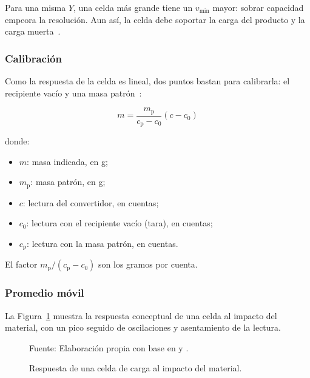 Para una misma $Y$, una celda más grande tiene un $v_{\min}$ mayor: sobrar
capacidad empeora la resolución. Aun así, la celda debe soportar la carga del
producto y la carga muerta~\parencite{challco2024dosificadora}.

\subsubsection{Calibración}
\label{subsubsec:fund_calibracion}

Como la respuesta de la celda es lineal, dos puntos bastan para calibrarla:
el recipiente vacío y una masa patrón~\parencite{fraden2016handbook}:

\begin{equation}
    m = \frac{m_{\mathrm{p}}}{c_{\mathrm{p}} - c_{0}} \left( c - c_{0} \right)
    \label{eq:calibracion}
\end{equation}

\noindent donde:

\begin{itemize}[nosep, label={}, leftmargin=1.5em]
    \item $m$: masa indicada, en g;
    \item $m_{\mathrm{p}}$: masa patrón, en g;
    \item $c$: lectura del convertidor, en cuentas;
    \item $c_{0}$: lectura con el recipiente vacío (tara), en cuentas;
    \item $c_{\mathrm{p}}$: lectura con la masa patrón, en cuentas.
\end{itemize}

El factor $m_{\mathrm{p}}/(c_{\mathrm{p}} - c_{0})$ son los gramos por cuenta.

\subsubsection{Promedio móvil}
\label{subsubsec:fund_filtro}

La Figura~\ref{fig:respuesta_celda} muestra la respuesta conceptual de una
celda al impacto del material, con un pico seguido de oscilaciones y
asentamiento de la lectura.

\begin{figure}[H]
    \centering
    \resizebox{0.8\textwidth}{!}{}
    \caption{Respuesta de una celda de carga al impacto del material.}
    \label{fig:respuesta_celda}
    \vspace{0.2em}
    {\footnotesize Fuente: Elaboración propia con base en
    \textcite{richiedei2018shaper} y \textcite{wang2025batching}.}
\end{figure}

